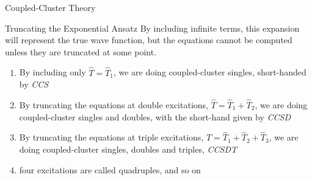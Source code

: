 \documentclass[twoside,english]{uiofysmaster}
\begin{document}
\begin{chapter}{Coupled-Cluster Theory}
	\begin{section}{Truncating the Exponential Ansatz}
	  	By including infinite terms, this expansion will represent the true wave function, but the equations cannot be computed unless they are truncated at some point. 
	  	\begin{enumerate}
	  		\item By including only $\hat T = \hat T_1$, we are doing coupled-cluster singles, short-handed by \textit{CCS}
	  		\item By truncating the equations at double excitations, $\hat T = \hat T_1 + \hat T_2$, we are doing coupled-cluster singles and doubles, with the short-hand given by \textit{CCSD}
	  		\item By truncating the equations at triple excitations, $\hat T = \hat T_1 + \hat T_2 + \hat T_3$, we are doing coupled-cluster singles, doubles and 		triples, \textit{CCSDT}
	  		\item four excitations are called quadruples, and so on
	  	\end{enumerate}


\end{section}
\end{chapter}
\end{document}
